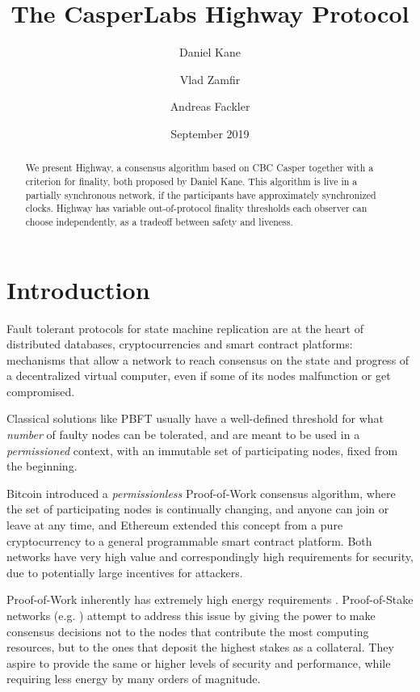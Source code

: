 \documentclass[12pt, fleqn]{article}
\title{The CasperLabs Highway Protocol}
\author[1]{Daniel Kane}
\author[2]{Vlad Zamfir}
\author[3]{Andreas Fackler}
\affil[1]{Computer Science and Engineering Department, UC San Diego}
\affil[2]{Ethereum Research}
\affil[3]{CasperLabs LLC}
\date{September 2019}
\begin{document}
\maketitle
\tableofcontents
\pagebreak


\begin{abstract}
We present Highway, a consensus algorithm based on CBC Casper together with a criterion for finality, both proposed by Daniel Kane. This algorithm is live in a partially synchronous network, if the participants have approximately synchronized clocks. Highway has variable out-of-protocol finality thresholds each observer can choose independently, as a tradeoff between safety and liveness.
\end{abstract}


\section*{Introduction}

Fault tolerant protocols for state machine replication are at the heart of distributed databases, cryptocurrencies and smart contract platforms: mechanisms that allow a network to reach consensus on the state and progress of a decentralized virtual computer, even if some of its nodes malfunction or get compromised.

Classical solutions like PBFT \cite{castro1999practical} usually have a well-defined threshold for what \emph{number} of faulty nodes can be tolerated, and are meant to be used in a \emph{permissioned} context, with an immutable set of participating nodes, fixed from the beginning.

Bitcoin \cite{nakamoto2008bitcoin} introduced a \emph{permissionless} Proof-of-Work consensus algorithm, where the set of participating nodes is continually changing, and anyone can join or leave at any time, and Ethereum \cite{wood2014ethereum} extended this concept from a pure cryptocurrency to a general programmable smart contract platform. Both networks have very high value and correspondingly high requirements for security, due to potentially large incentives for attackers.

Proof-of-Work inherently has extremely high energy requirements \cite{de2018bitcoin}. Proof-of-Stake networks (e.g. \cite{kiayias2017ouroboros}) attempt to address this issue by giving the power to make consensus decisions not to the nodes that contribute the most computing resources, but to the ones that deposit the highest stakes as a collateral. They aspire to provide the same or higher levels of security and performance, while requiring less energy by many orders of magnitude.
\end{document}
